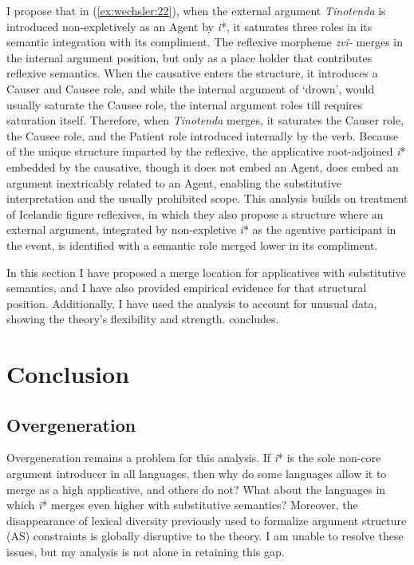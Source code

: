 \documentclass[output=paper,modfonts,nonflat,colorlinks,citecolor=brown]{langsci/langscibook}
\begin{document}
I propose that in (\ref{ex:wechsler:22}), when the external argument \textit{Tinotenda} is introduced non-expletively as an Agent by \textit{i}*, it saturates three roles in its semantic integration with its compliment. The reflexive morpheme \textit{zvi-} merges in the internal argument position, but only as a place holder that contributes reflexive semantics. When the causative enters the structure, it introduces a Causer and Causee role, and while the internal argument of ‘drown’, would usually saturate the Causee role, the internal argument roles till requires saturation itself. Therefore, when \textit{Tinotenda} merges, it saturates the Causer role, the Causee role, and the Patient role introduced internally by the verb. Because of the unique structure imparted by the reflexive, the applicative root-adjoined \textit{i}* embedded by the causative, though it does not embed an Agent, does embed an argument inextricably related to an Agent, enabling the substitutive interpretation and the usually prohibited scope. This analysis builds on  treatment of Icelandic figure reflexives, in which they also propose a structure where an external argument, integrated by non-expletive \textit{i}* as the agentive participant in the event, is identified with a semantic role merged lower in its compliment. 


In this section I have proposed a merge location for applicatives with substitutive semantics, and I have also provided empirical evidence for that structural position. Additionally, I have used the analysis to account for unusual data, showing the theory’s flexibility and strength.  concludes. 

\section{Conclusion}\label{sec:wechsler:4}

\subsection{Overgeneration}\label{sec:wechsler:4.1}

Overgeneration remains a problem for this analysis. If \textit{i}* is the sole non-core argument introducer in all languages, then why do some languages allow it to merge as a high applicative, and others do not? What about the languages in which \textit{i}* merges even higher with substitutive semantics? Moreover, the disappearance of lexical diversity previously used to formalize argument structure (AS) constraints is globally disruptive to the theory. I am unable to resolve these issues, but my analysis is not alone in retaining this gap.
\end{document}
